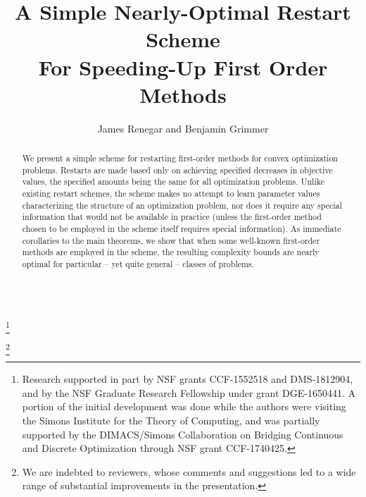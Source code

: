 \documentclass[reqno, 11pt]{amsart}
\numberwithin{equation}{section}
\begin{document}
\newpage 
$ \textrm{~} $ \quad \vspace{-3mm}

 

\title[A Simple Nearly-Optimal Restart Scheme]{A Simple Nearly-Optimal Restart Scheme \\ For Speeding-Up First Order Methods}

 

\begin{abstract}
We present a simple scheme for restarting first-order methods for convex optimization problems. Restarts are made based only on achieving specified decreases in objective values, the specified amounts being the same for all optimization problems. Unlike existing restart schemes, the scheme makes no attempt to learn parameter values characterizing the structure of an optimization problem, nor does it require any special information that would not be available in practice (unless the first-order method chosen to be employed in the scheme itself requires special information).  As immediate corollaries to the main theorems, we show that when some well-known first-order methods are employed in the scheme, the resulting complexity bounds are  nearly optimal for particular -- yet quite general -- classes of problems.
\end{abstract} \vspace{-3mm}

\author[J. Renegar and B. Grimmer]{James Renegar and Benjamin Grimmer}
\address{School of Operations Research and Information Engineering,
 Cornell University, Ithaca, NY, U.S.} 
\thanks{Research supported in part by NSF grants CCF-1552518 and DMS-1812904, and by the NSF Graduate Research Fellowship under grant DGE-1650441.
A portion of the initial development was done while the authors were visiting the Simons Institute for the Theory of Computing, and was partially supported by the DIMACS/Simons Collaboration on Bridging Continuous and Discrete Optimization through NSF grant CCF-1740425. }

\thanks{We are indebted to reviewers, whose comments and suggestions led to a wide range of substantial improvements in the presentation.}

\maketitle

\vspace{-7mm}
\end{document}
